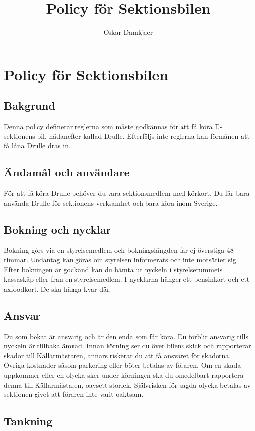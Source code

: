 \documentclass{dsekkallelse}
\title{Policy för Sektionsbilen}
\author{Oskar Damkjaer}
\begin{document}
\section*{Policy för Sektionsbilen}

\subsection{Bakgrund}

Denna policy definerar reglerna som måste godkännas för att få köra D-sektionens bil, hädanefter kallad Drulle. Efterföljs inte reglerna kan förmånen att få låna Drulle dras in.

\subsection{Ändamål och användare}

För att få köra Drulle behöver du vara sektionsmedlem med körkort. Du får bara använda Drulle för sektionens verksamhet och bara köra inom Sverige.

\subsection{Bokning och nycklar}

Bokning görs via en styrelsemedlem och bokningslängden får ej överstiga 48 timmar. Undantag kan göras om styrelsen informerats och inte motsätter sig. Efter bokningen är godkänd kan du hämta ut nyckeln i styrelserummets kassaskåp eller från en styrelsemedlem. I nycklarna hänger ett bensinkort och ett axfoodkort. De ska hänga kvar där.

\subsection{Ansvar}

Du som bokat är ansvarig och är den enda som får köra. Du förblir ansvarig tills nyckeln är tillbakalämnad. Innan körning ser du över bilens skick och rapporterar skador till Källarmästaren, annars riskerar du att få ansvaret för skadorna. Övriga kostnader såsom parkering eller böter betalas av föraren. Om en skada uppkommer eller en olycka sker under körningen ska du omedelbart rapportera denna till Källarmästaren, oavsett storlek. Självrisken för sagda olycka betalas av sektionen givet att föraren inte varit oaktsam.

\subsection{Tankning}
\end{document}

